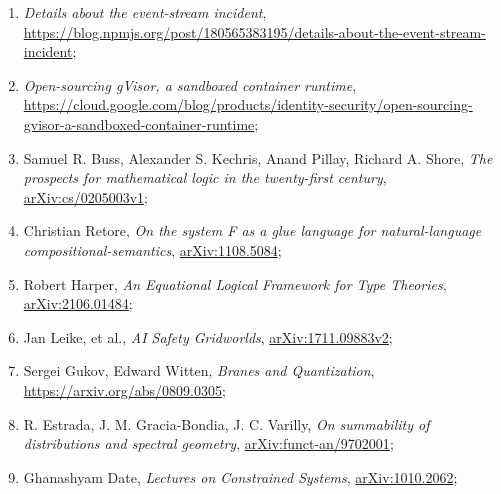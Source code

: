\documentclass[a4paper,11pt]{article}
\begin{document}
\begin{enumerate}
\item \textit{Details about the event-stream incident}, \\
  \href{https://blog.npmjs.org/post/180565383195/details-about-the-event-stream-incident}{https://blog.npmjs.org/post/180565383195/details-about-the-event-stream-incident};



\item \textit{Open-sourcing gVisor, a sandboxed container runtime}, \\
  \href{https://cloud.google.com/blog/products/identity-security/open-sourcing-gvisor-a-sandboxed-container-runtime}{https://cloud.google.com/blog/products/identity-security/open-sourcing-gvisor-a-sandboxed-container-runtime};



\item Samuel R. Buss, Alexander S. Kechris, Anand Pillay, Richard A.
  Shore, \textit{The prospects for mathematical logic in the
    twenty-first century},
  \href{https://arxiv.org/abs/cs/0205003v1}{arXiv:cs/0205003v1};



\item Christian Retore, \textit{On the system F as a glue language for
    natural-language compositional-semantics},
  \href{https://arxiv.org/abs/1108.5084}{arXiv:1108.5084};



\item Robert Harper, \textit{An Equational Logical Framework for Type
    Theories},
  \href{https://arxiv.org/abs/2106.01484}{arXiv:2106.01484};



\item Jan Leike, et al., \textit{AI Safety Gridworlds},
  \href{https://arxiv.org/abs/1711.09883}{arXiv:1711.09883v2};



\item Sergei Gukov, Edward Witten, \textit{Branes and Quantization},
  \href{https://arxiv.org/abs/0809.0305}{https://arxiv.org/abs/0809.0305};



\item R. Estrada, J. M. Gracia-Bondia, J. C. Varilly, \textit{On
    summability of distributions and spectral geometry},
  \href{https://arxiv.org/abs/funct-an/9702001v1}{arXiv:funct-an/9702001};



\item Ghanashyam Date, \textit{Lectures on Constrained Systems},
  \href{https://arxiv.org/abs/1010.2062v1}{arXiv:1010.2062};




\end{enumerate}
\end{document}
